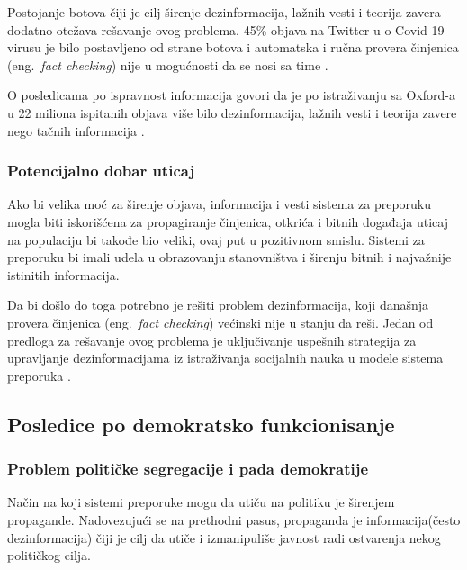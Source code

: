 \documentclass[a4paper]{article}
\begin{document}
Postojanje botova čiji je cilj širenje dezinformacija, lažnih vesti i teorija zavera dodatno otežava rešavanje ovog problema. 45\% objava na Twitter-u o Covid-19 virusu je bilo postavljeno od strane botova \cite{NPR_2020} i automatska i ručna provera činjenica (eng.~{\em fact checking}) nije u mogućnosti da se nosi sa time \cite{Jon-Patrick_Allem}.

O posledicama po ispravnost informacija govori da je po istraživanju sa Oxford-a u 22 miliona ispitanih objava više bilo dezinformacija, lažnih vesti i teorija zavere nego tačnih informacija \cite{Howard}.


\subsubsection{Potencijalno dobar uticaj}
\label{subsec:potencijal_informacije 2}


Ako bi velika moć za širenje objava, informacija i vesti sistema za preporuku mogla biti iskorišćena za propagiranje činjenica, otkrića i bitnih događaja uticaj na populaciju bi takođe bio veliki, ovaj put u pozitivnom smislu. Sistemi za preporuku bi imali udela u obrazovanju stanovništva i širenju bitnih i najvažnije istinitih informacija.

Da bi došlo do toga potrebno je rešiti problem dezinformacija, koji današnja provera činjenica (eng.~{\em fact checking}) većinski nije u stanju da reši. Jedan od predloga za rešavanje ovog problema je uključivanje uspešnih strategija za upravljanje dezinformacijama iz istraživanja socijalnih nauka u modele sistema preporuka  \cite{fernandez2020recommender}.


\subsection{Posledice po demokratsko funkcionisanje}
\label{subsec: posledice_demokratija 2}


\subsubsection{Problem političke segregacije i pada demokratije}
\label{subsec: problem_demokratija 1}


Način na koji sistemi preporuke mogu da utiču na politiku je širenjem propagande. Nadovezujući se na prethodni pasus, propaganda je informacija(često dezinformacija) čiji je cilj da utiče i izmanipuliše javnost radi ostvarenja nekog političkog cilja.
\end{document}
